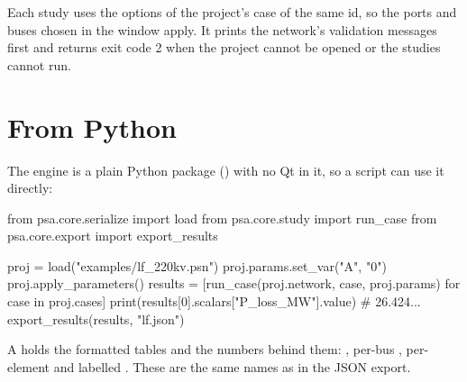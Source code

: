 Each study uses the options of the project's case of the same id, so the ports and buses
chosen in the window apply. It prints the network's validation messages first and
returns exit code 2 when the project cannot be opened or the studies cannot run.

\section{From Python}

The engine is a plain Python package () with no Qt in it, so a script can
use it directly:

\begin{terminal}
from psa.core.serialize import load
from psa.core.study import run_case
from psa.core.export import export_results

proj = load("examples/lf_220kv.psn")
proj.params.set_var("A", "0")
proj.apply_parameters()
results = [run_case(proj.network, case, proj.params) for case in proj.cases]
print(results[0].scalars["P_loss_MW"].value)       # 26.424...
export_results(results, "lf.json")
\end{terminal}

A  holds the formatted tables and the numbers behind them: ,
per-bus , per-element  and labelled . These are
the same names as in the JSON export.

